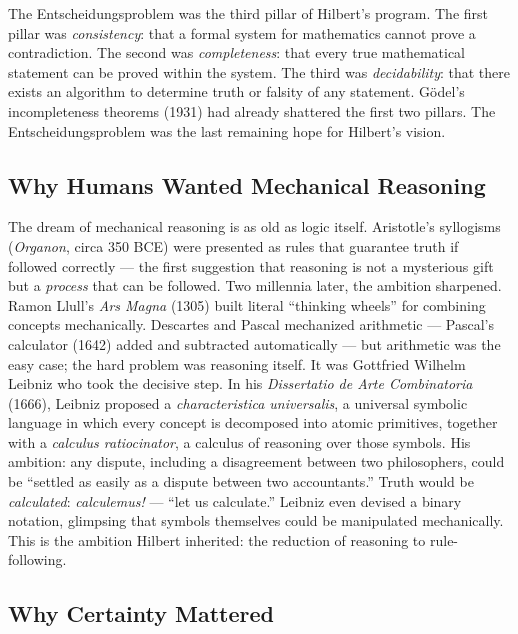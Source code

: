 The Entscheidungsproblem was the third pillar of Hilbert's program. The first pillar was \emph{consistency}: that a formal system for mathematics cannot prove a contradiction. The second was \emph{completeness}: that every true mathematical statement can be proved within the system. The third was \emph{decidability}: that there exists an algorithm to determine truth or falsity of any statement. G\"odel's incompleteness theorems (1931) had already shattered the first two pillars. The Entscheidungsproblem was the last remaining hope for Hilbert's vision.

\subsection{Why Humans Wanted Mechanical Reasoning}
\label{sec:computation:why_mechanical}

The dream of mechanical reasoning is as old as logic itself. Aristotle's syllogisms (\emph{Organon}, circa 350 BCE) were presented as rules that guarantee truth if followed correctly --- the first suggestion that reasoning is not a mysterious gift but a \emph{process} that can be followed. Two millennia later, the ambition sharpened. Ramon Llull's \emph{Ars Magna} (1305) built literal ``thinking wheels'' for combining concepts mechanically. Descartes and Pascal mechanized arithmetic --- Pascal's calculator (1642) added and subtracted automatically --- but arithmetic was the easy case; the hard problem was reasoning itself. It was Gottfried Wilhelm Leibniz who took the decisive step. In his \emph{Dissertatio de Arte Combinatoria} (1666), Leibniz proposed a \emph{characteristica universalis}, a universal symbolic language in which every concept is decomposed into atomic primitives, together with a \emph{calculus ratiocinator}, a calculus of reasoning over those symbols. His ambition: any dispute, including a disagreement between two philosophers, could be ``settled as easily as a dispute between two accountants.'' Truth would be \emph{calculated}: \emph{calculemus!} --- ``let us calculate.'' Leibniz even devised a binary notation, glimpsing that symbols themselves could be manipulated mechanically. This is the ambition Hilbert inherited: the reduction of reasoning to rule-following.

\subsection{Why Certainty Mattered}
\label{sec:computation:why_certainty}

